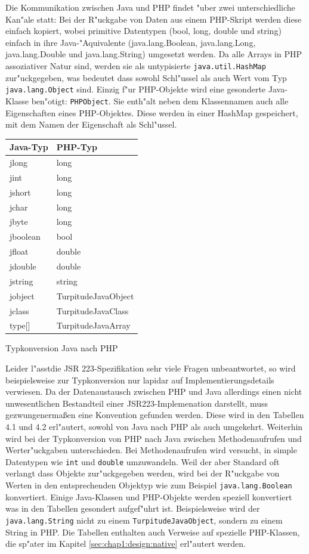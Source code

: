 Die Kommunikation zwischen Java und PHP findet "uber zwei unterschiedliche Kan"ale statt:
Bei der R"uckgabe von Daten aus einem PHP-Skript werden diese einfach kopiert, wobei primitive Datentypen (bool, long, double und string)
einfach in ihre Java-"Aquivalente (java.lang.Boolean, java.lang.Long, java.lang.Double und java.lang.String) umgesetzt werden.
Da alle Arrays in PHP assoziativer Natur sind, werden sie als untypisierte \texttt{java.util.HashMap} zur"uckgegeben, was bedeutet dass sowohl 
Schl"ussel als auch Wert vom Typ \texttt{java.lang.Object} sind. Einzig f"ur PHP-Objekte wird eine gesonderte Java-Klasse ben"otigt: \texttt{PHPObject}.
Sie enth"alt neben dem Klassennamen auch alle Eigenschaften eines PHP-Objektes. 
Diese werden in einer HashMap gespeichert, mit dem Namen der Eigenschaft als Schl"ussel.
\begin{floatingtable}{
\begin{tabular}{|l|l|}
\hline
Java-Typ & PHP-Typ\\
\hline\hline
jlong & long\\
jint & long\\
jshort & long\\
jchar & long\\
jbyte & long\\
jboolean & bool\\
jfloat & double\\
jdouble & double\\
jstring & string\\
jobject & TurpitudeJavaObject\\
jclass & TurpitudeJavaClass\\
type[] & TurpitudeJavaArray\\
\hline
\end{tabular}}
\caption{Typkonversion Java nach PHP}
\end{floatingtable}
Leider l"asstdie JSR 223-Spezifikation sehr viele Fragen unbeantwortet, so wird beispielsweise zur Typkonversion nur lapidar auf 
Implementierungsdetails verwiesen. Da der Datenaustausch zwischen PHP und Java allerdings einen nicht unwesentlichen Bestandteil
einer JSR223-Implemenation darstellt, muss gezwungenerma\ss en eine Konvention gefunden werden. Diese wird in den Tabellen 4.1 und 4.2
erl"autert, sowohl von Java nach PHP als auch umgekehrt. Weiterhin wird bei der Typkonversion von PHP nach Java zwischen 
Methodenaufrufen und Werter"uckgaben unterschieden. Bei Methodenaufrufen wird versucht, in simple Datentypen wie \texttt{int} und \texttt{double}
umzuwandeln. Weil der aber Standard oft verlangt dass Objekte zur"uckgegeben werden, wird bei der R"uckgabe von Werten in den entsprechenden
Objektyp wie zum Beispiel \texttt{java.lang.Boolean} konvertiert. Einige Java-Klassen und PHP-Objekte werden speziell konvertiert was
in den Tabellen gesondert aufgef"uhrt ist. Beispielsweise wird der
\texttt{java.lang.String} nicht zu einem \texttt{TurpitudeJavaObject}, sondern zu einem String in PHP. Die
Tabellen enthalten auch Verweise auf spezielle PHP-Klassen, die sp"ater im Kapitel \ref{sec:chap1:design:native} erl"autert werden.

